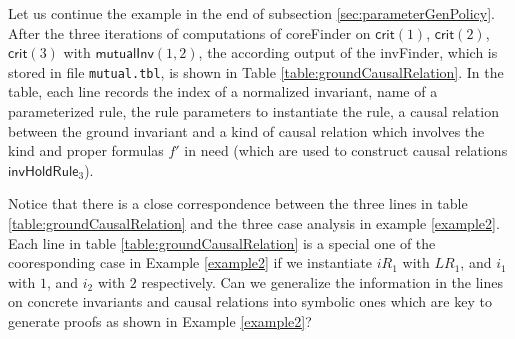 \documentclass[conference]{IEEEtran}
\def \eqc {\doteq }
\def \andc {\barwedge }
\def \negc {!}
\newcommand{\forget}[1]{}
\begin{document}
{\begin{table}[htbp]
\begin{tabular}{|c|c|c|c|c|  }
\end{tabular}
\end{table}

\vspace{-5pt}
Let us continue the example in the end of subsection \ref{sec:parameterGenPolicy}. After the three iterations of computations of {\sf coreFinder} on $\mathsf{crit}(1)$, $\mathsf{crit}(2)$, $\mathsf{crit}(3)$ with  $\mathsf{mutualInv}(1,2)$, the according output of the {\sf invFinder}, which is stored in file {\tt mutual.tbl},  is shown in Table
\ref{table:groundCausalRelation}. In the table,  each line records the    index of a normalized   invariant, name of a parameterized rule, the rule
  parameters to instantiate the rule, a causal relation between
  the ground invariant and a kind of causal relation which involves the kind and proper formulas
  $f'$   in need (which are used to construct
      causal relations $\mathsf{invHoldRule}_3$).

Notice that there is a close correspondence between the three lines in table \ref{table:groundCausalRelation} and the three case analysis in example \ref{example2}. Each line in table \ref{table:groundCausalRelation} is a special one of the cooresponding case in Example \ref{example2} if we instantiate $iR_1$ with $LR_{1}$, and $i_1$ with $1$, and $i_2$ with $2$ respectively. Can we generalize the information in the lines on concrete invariants and causal relations into symbolic ones which are key to generate proofs as shown in Example \ref{example2}?


\forget{For instance, let $PR=\{try, crit, exit, idle\}$, $invs=\{mutualInv(1,2)\}$,    the output of the {\sf invFinder}, which is stored in file {\tt mutual.tbl},  is shown in Table
\ref{table:groundCausalRelation}. In the table,  each line records the    index of a normalized   invariant, name of a parameterized rule, the rule
  parameters to instantiate the rule, a causal relation between
  the ground invariant and a kind of causal relation which involves the kind and proper formulas
  $f'$   in need (which are used to construct
      causal relations $\mathsf{invHoldRule}_3$). The auxiliary invariants found by {\sf invFinder} include: $\mathsf{inv_2}  \equiv  \negc (\mathsf{x} \eqc true  \andc  n[1]=C)$, $\mathsf{inv_3}    \equiv \negc  ( n[1]=C \andc n[2]=E)$,
$\mathsf{inv_4}  \equiv  \negc (x \eqc \mathsf{true}  \andc  n[1]\eqc \mathsf{E})$,   $\mathsf{inv_5}    \equiv \negc  ( n[1]\eqc \mathsf{C} \andc n[2] \eqc \mathsf{C})$.  \footnote{The names $\mathsf{mutualEx}$ and $\mathsf{invOnX1}$ in
  this work are just for easy-reading, their
 index here is generated  in some order by {\sf invFinder}}.}


}
\end{document}
